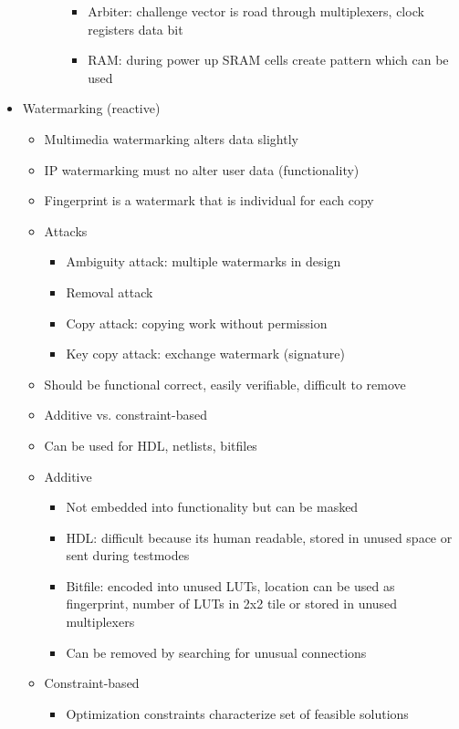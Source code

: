 \documentclass[11pt, paper=a4, twocolumn]{scrartcl}
\begin{document}
\begin{itemize}
\begin{itemize}
\begin{itemize}
\begin{itemize}
									\item Arbiter: challenge vector is road through multiplexers, clock registers 
										data bit 
									\item RAM: during power up SRAM cells create pattern which can be used
								\end{itemize}
						\end{itemize}
				\end{itemize}
			\item Watermarking (reactive)
				\begin{itemize}
					\item Multimedia watermarking alters data slightly
					\item IP watermarking must no alter user data (functionality)
					\item Fingerprint is a watermark that is individual for each copy
					\item Attacks
						\begin{itemize}
							\item Ambiguity attack: multiple watermarks in design
							\item Removal attack
							\item Copy attack: copying work without permission
							\item Key copy attack: exchange watermark (signature)
						\end{itemize}
					\item Should be functional correct, easily verifiable, difficult to remove
					\item Additive vs. constraint-based
					\item Can be used for HDL, netlists, bitfiles
					\item Additive
						\begin{itemize}
							\item Not embedded into functionality but can be masked
							\item HDL: difficult because its human readable, stored in unused space or sent during testmodes
							\item Bitfile: encoded into unused LUTs, location can be used as fingerprint, number of LUTs in 
								2x2 tile or stored in unused multiplexers
							\item Can be removed by searching for unusual connections
						\end{itemize}
					\item Constraint-based
						\begin{itemize}
							\item Optimization constraints characterize set of feasible solutions

\end{itemize}
\end{itemize}
\end{itemize}
\end{document}
